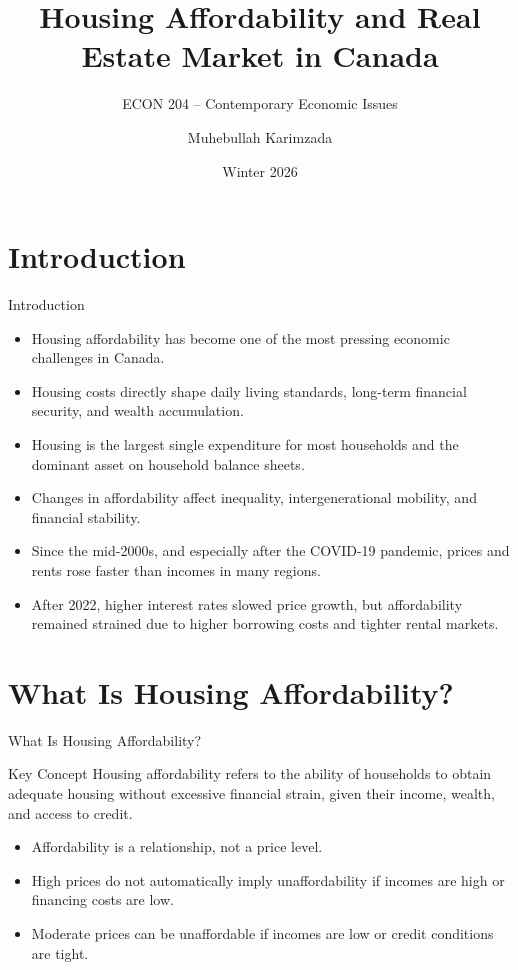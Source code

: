 \documentclass[aspectratio=169]{beamer}
\title[Housing Affordability]{Housing Affordability and Real Estate Market in Canada}
\subtitle{ECON 204 -- Contemporary Economic Issues}
\author{Muhebullah Karimzada}
\date{Winter 2026}
\begin{document}
\maketitle

\section{Introduction}

\begin{frame}{Introduction}
\transfade
\begin{itemize}[<+->]
  \item Housing affordability has become one of the most pressing economic challenges in Canada.
  \item Housing costs directly shape daily living standards, long-term financial security, and wealth accumulation.
  \item Housing is the largest single expenditure for most households and the dominant asset on household balance sheets.
  \item Changes in affordability affect inequality, intergenerational mobility, and financial stability.
  \item Since the mid-2000s, and especially after the COVID-19 pandemic, prices and rents rose faster than incomes in many regions.
  \item After 2022, higher interest rates slowed price growth, but affordability remained strained due to higher borrowing costs and tighter rental markets.
\end{itemize}
\end{frame}

\section{What Is Housing Affordability?}

\begin{frame}{What Is Housing Affordability?}
\transfade
\begin{block}{Key Concept}
Housing affordability refers to the ability of households to obtain adequate housing without excessive financial strain, given their income, wealth, and access to credit.
\end{block}

\begin{itemize}[<+->]
  \item Affordability is a relationship, not a price level.
  \item High prices do not automatically imply unaffordability if incomes are high or financing costs are low.
  \item Moderate prices can be unaffordable if incomes are low or credit conditions are tight.
\end{itemize}
\end{frame}
\end{document}
